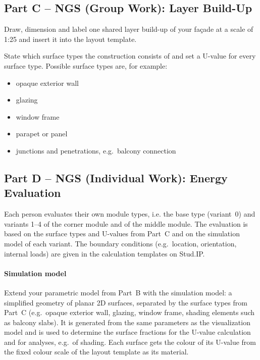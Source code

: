 \subsection{Part C – NGS (Group Work): Layer Build-Up}
Draw, dimension and label one shared layer build-up of your façade at a scale of 1:25 and insert it into the layout template.

State which surface types the construction consists of and set a U-value for every surface type. Possible surface types are, for example:
\begin{itemize}
  \item opaque exterior wall
  \item glazing
  \item window frame
  \item parapet or panel
  \item junctions and penetrations, e.g.~balcony connection
\end{itemize}
\subsection{Part D – NGS (Individual Work): Energy Evaluation}
Each person evaluates their own module types, i.e. the base type (variant~0) and variants 1–4 of the corner module and of the middle module. The evaluation is based on the surface types and U-values from Part~C and on the simulation model of each variant. The boundary conditions (e.g.~location, orientation, internal loads) are given in the calculation templates on Stud.IP.
\paragraph{Simulation model}
Extend your parametric model from Part~B with the simulation model: a simplified geometry of planar 2D surfaces, separated by the surface types from Part~C (e.g.~opaque exterior wall, glazing, window frame, shading elements such as balcony slabs). It is generated from the same parameters as the visualization model and is used to determine the surface fractions for the U-value calculation and for analyses, e.g.~of shading. Each surface gets the colour of its U-value from the fixed colour scale of the layout template as its material.

